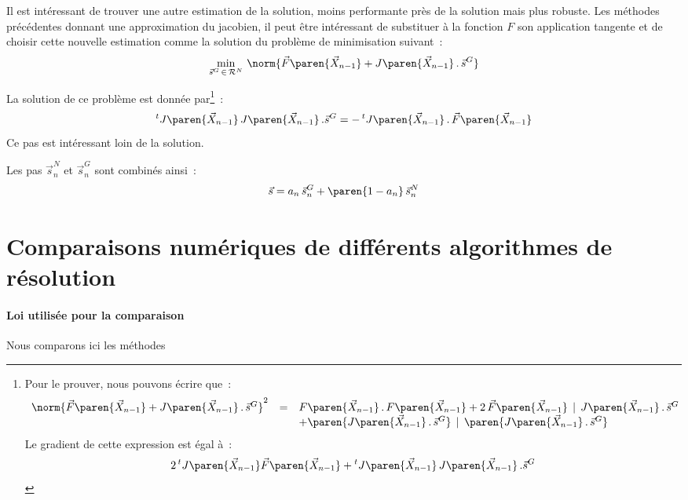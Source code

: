 \documentclass[12pt]{article}
\begin{document}
Il est intéressant de trouver une autre estimation de la solution, moins
performante près de la solution mais plus robuste. Les méthodes
précédentes donnant une approximation du jacobien, il peut être
intéressant de substituer à la fonction \(F\) son application tangente
et de choisir cette nouvelle estimation comme la solution du problème de
minimisation suivant~:
\[
\min_{\vec{s}^{G}\,\in\,\mathcal{R}^{N}}\,\norm{\vec{F}\paren{\vec{X}_{n-1}}+J\paren{\vec{X}_{n-1}}\,.\,\vec{s}^{G}}
\]

La solution de ce problème est donnée par\footnote{Pour le prouver,
  nous pouvons écrire que~:
  \[
  \begin{array}{rcl}
    \norm{\vec{F}\paren{\vec{X}_{n-1}}+J\paren{\vec{X}_{n-1}}\,.\,\vec{s}^{G}}^{2}
    &=& {F}\paren{\vec{X}_{n-1}}\,.\,{F}\paren{\vec{X}_{n-1}}+2\,\vec{F}\paren{\vec{X}_{n-1}}\,\mid\,J\paren{\vec{X}_{n-1}}\,.\,\vec{s}^{G} \\
    &&+\paren{J\paren{\vec{X}_{n-1}}\,.\,\vec{s}^{G}}\,\mid\,\paren{J\paren{\vec{X}_{n-1}}\,.\,\vec{s}^{G}}
  \end{array}
  \]
  Le gradient de cette expression est égal à~:
  \[
  2\,\mbox{}^{t}J\paren{\vec{X}_{n-1}}\vec{F}\paren{\vec{X}_{n-1}}+\mbox{}^{t}J\paren{\vec{X}_{n-1}}\,J\paren{\vec{X}_{n-1}}\,.\vec{s}^{G}
  \]
}~:
\[
\mbox{}^{t}J\paren{\vec{X}_{n-1}}\,J\paren{\vec{X}_{n-1}}\,.\vec{s}^{G}=-\,\mbox{}^{t}J\paren{\vec{X}_{n-1}}\,.\,\vec{F}\paren{\vec{X}_{n-1}}
\]
Ce pas est intéressant loin de la solution.

Les pas \(\vec{s}^{N}_{n}\) et \(\vec{s}_{n}^{G}\) sont combinés ainsi~:
\[
\vec{s} = a_{n} \,\vec{s}^{G}_{n} + \paren{1-a_{n}}\,\vec{s}_{n}^{N}
\]

\clearpage
\newpage
\section{Comparaisons numériques de différents algorithmes de résolution}
\label{QNR:ComparaisonNumeriques}

\paragraph{Loi utilisée pour la comparaison}


Nous comparons ici les méthodes 
\end{document}
